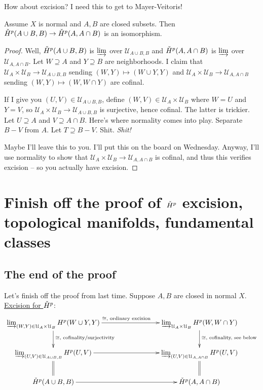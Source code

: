 How about excision? I need this to get to Mayer-Veitoris!
\begin{lemma}
Assume $X$ is normal and $A,B$ are closed subsets. Then $\check{H}^p(A\cup B,B)\to\check{H}^p(A,A\cap B)$ is an isomorphism. 
\end{lemma}
\begin{proof}
Well, $\check{H}^p(A\cup B,B)$ is $\varinjlim$ over $\mathcal{U}_{A\cup B,B}$ and $\check{H}^p(A,A\cap B)$ is $\varinjlim$ over $\mathcal{U}_{A,A\cap B}$. Let $W\supseteq A$ and $Y\supseteq B$ are neighborhoods. I claim that $\mathcal{U}_A\times\mathcal{U}_B\to\mathcal{U}_{A\cup B,B}$ sending $(W,Y)\mapsto (W\cup Y,Y)$ and $\mathcal{U}_A\times\mathcal{U}_B\to\mathcal{U}_{A,A\cap B}$ sending $(W,Y)\mapsto (W,W\cap Y)$ are cofinal.

If I give you $(U,V)\in \mathcal{U}_{A\cup B,B}$, define $(W,V)\in\mathcal{U}_A\times\mathcal{U}_B$ where $W=U$ and $Y=V$, so $\mathcal{U}_A\times\mathcal{U}_B\to\mathcal{U}_{A\cup B,B}$ is surjective, hence cofinal. The latter is trickier. Let $U\supseteq A$ and $V\supseteq A\cap B$. Here's where normality comes into play. Separate $B-V$ from $A$. Let $T\supseteq B-V$. Shit. \emph{Shit!}

Maybe I'll leave this to you. I'll put this on the board on Wednesday. Anyway, I'll use normality to show that $\mathcal{U}_A\times\mathcal{U}_B\to\mathcal{U}_{A,A\cap B}$ is cofinal, and thus this verifies excision -- so you actually have excision.
\end{proof}
\section{Finish off the proof of $\check{H}^p$ excision, topological manifolds, fundamental classes}
\subsection{The end of the proof}
Let's finish off the proof from last time. Suppose $A,B$ are closed in normal $X$. \underline{Excision for $\check{H}^p$}:
\begin{equation*}
\xymatrix{
	\varinjlim_{(W,Y)\in\mathcal{U}_A\times\mathcal{U}_B}H^p(W\cup Y,Y)\ar[rrr]^{\cong,\text{ ordinary excision}}\ar[d]^{\cong,\text{ cofinality/surjectivity}} & & & \varinjlim_{\mathcal{U}_A\times\mathcal{U}_B}H^p(W,W\cap Y)\ar[d]^{\cong,\text{ cofinality, see below}}\\
	\varinjlim_{(U,V)\in\mathcal{U}_{A\cup B,B}}H^p(U,V)\ar[rrr]\ar@{=}[d] & & & \varinjlim_{(U,V)\in\mathcal{U}_{A,A\cap B}}H^p(U,V)\ar@{=}[d]\\
	\cHH^p(A\cup B,B)\ar[rrr] & & & \cHH^p(A,A\cap B)
}
\end{equation*}

